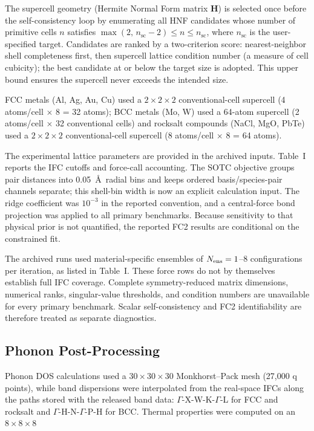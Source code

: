 \documentclass[aps,prb,reprint,amsmath,amssymb,floatfix]{revtex4-2}
\begin{document}
The supercell geometry (Hermite Normal Form matrix \(\mathbf{H}\)) is
selected once before the self-consistency loop by enumerating all HNF
candidates whose number of primitive cells \(n\) satisfies
\(\max(2,\,n_\text{sc}-2) \le n \le n_\text{sc}\), where
\(n_\text{sc}\) is the user-specified target. Candidates are ranked by a
two-criterion score: nearest-neighbor shell completeness first, then
supercell lattice condition number (a measure of cell cubicity); the best candidate at or below the
target size is adopted. This upper bound ensures the supercell never
exceeds the intended size.

\color{revisionblue}
FCC metals (Al, Ag, Au, Cu) used a \(2\times2\times2\) conventional-cell
supercell (4 atoms/cell \(\times\) 8 = 32 atoms); BCC metals (Mo, W)
used a 64-atom supercell (2 atoms/cell \(\times\) 32 conventional cells)
and rocksalt compounds (NaCl, MgO, PbTe) used a \(2\times2\times2\)
conventional-cell supercell (8 atoms/cell \(\times\) 8 = 64 atoms).
\color{black}

\color{revisionblue}
The experimental lattice parameters are provided in the archived inputs.
Table~I reports the IFC cutoffs and force-call accounting. The SOTC objective
groups pair distances into 0.05~\AA\ radial bins and keeps ordered
basis/species-pair channels separate; this shell-bin width is now an explicit
calculation input. The ridge coefficient was \(10^{-3}\) in the reported
convention, and a central-force
bond projection was applied to all primary benchmarks. Because sensitivity to
that physical prior is not quantified, the reported FC2 results are conditional
on the constrained fit.
\color{black}

\color{revisionblue}
The archived runs used material-specific ensembles of
\(N_{\rm ens}=1\)--8 configurations per iteration, as listed in Table~I.
These force rows do not by themselves establish full IFC coverage. Complete
symmetry-reduced matrix dimensions, numerical ranks, singular-value thresholds,
and condition numbers are unavailable for every primary benchmark. Scalar
self-consistency and FC2 identifiability are therefore treated as separate
diagnostics.
\color{black}

\subsection{Phonon Post-Processing}\label{phonon-post-processing}

\color{revisionblue}
Phonon DOS calculations used a \(30\times30\times30\) Monkhorst--Pack mesh
(27,000 q points), while band dispersions were interpolated from the real-space
IFCs along the paths stored with the released band data:
\(\Gamma\)-X-W-K-\(\Gamma\)-L for FCC and rocksalt and
\(\Gamma\)-H-N-\(\Gamma\)-P-H for BCC. Thermal properties were computed on an
\(8\times8\times8\)
\color{black}
\end{document}
